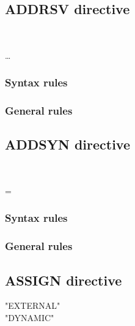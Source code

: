 \subsection{ADDRSV directive}

\begin{syntax}[\miscextcolour]
  \begin{1=}
     \\
  \end{1=}
  \literal \dots %
\end{syntax}

\subsubsection{Syntax rules}

\subsubsection{General rules}

\subsection{ADDSYN directive}

\begin{syntax}[\miscextcolour]
  \begin{1=}
     \\
  \end{1=}
  \literal = \literal
\end{syntax}

\subsubsection{Syntax rules}

\subsubsection{General rules}

\subsection{ASSIGN directive}

\begin{syntax}[\miscextcolour]
  \begin{1=}
    "EXTERNAL" \\
    "DYNAMIC"
  \end{1=}
\end{syntax}

